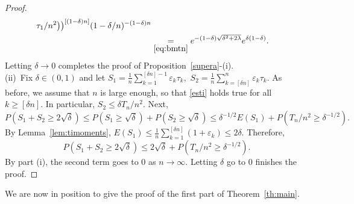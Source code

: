 \documentclass[12pt]{amsart}
\begin{document}
\begin{proof}
\begin{align*}
{\tau_1 /n^2}\bigr)\bigr)^{[(1-\delta)n]}  (1-\delta/n)^{-(1-\delta)n} \\
&\underset{\eqref{eq:bmtn}}{=}   e^{- (1-\delta) \sqrt{\delta^2 + 2\lambda} } e^{\delta (1-\delta)}.
\end{align*}
Letting $\delta \to 0$ completes the proof of
Proposition~\ref{supera}-(i).
\\
$\mbox{}$
\\
(ii)~Fix $\delta \in (0,1)$ and let $S_1 = \frac 1n \sum_{k=1}^{[\delta
n]-1}{\varepsilon}_k \tau_k,$ $S_2=\frac 1n \sum_{k=[\delta n]}^n {\varepsilon}_k
\tau_k$. As before, we assume that $n$ is large enough, so that
\eqref{esti} holds true for all $k\geq [\delta n]$. In particular,
$S_2 \le {\delta} T_n/n^2$. Next,
$$ P( S_1+S_2 \ge 2\sqrt{\delta}) \le P(S_1 \ge \sqrt{\delta})+
P(S_2 \ge \sqrt{\delta}) \le \delta^{-1/2} E (S_1) + P(T_n/n^2 \ge
\delta^{-1/2}).$$ By Lemma~\ref{lem:timoments}, $E (S_1) \le \frac
1n \sum_{k=1}^{[\delta n]}(1+{\varepsilon}_k)\le 2 \delta$. Therefore,
$$ P(S_1 +S_2 \ge 2\sqrt{\delta})\le 2\sqrt{\delta}+P(T_n/n^2 \ge \delta^{-1/2}).$$
By part (i), the second term goes to $0$ as
$n\to\infty.$ Letting $\delta$ go to $0$ finishes the proof.
\end{proof}
We are now in position to give the proof of the first part of
Theorem~\ref{th:main}.
\end{document}
